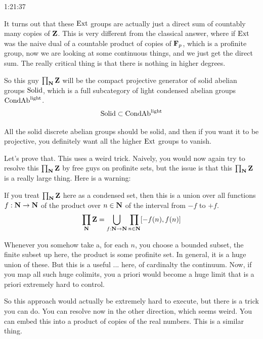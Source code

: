 \begin{unfinished}{1:21:37}
\begin{corollary}
\end{corollary}

It turns out that these $\operatorname{Ext}$ groups are actually just a direct sum of countably many copies of $\mathbf Z$. This is very different from the classical answer, where if $\operatorname{Ext}$ was the naive dual of a countable product of copies of $\mathbf F_p$, which is a profinite group, now we are looking at some continuous things, and we just get the direct sum. 
The really critical thing is that there is nothing in higher degrees.

So this guy $\prod_\mathbf N \mathbf Z$ will be the compact projective generator of solid abelian groups $\mathrm{Solid}$, which is a full subcategory of light condensed abelian groups $\mathrm{Cond}\mathrm{Ab}^{\mathrm{light}}$. 
\begin{align*}
\mathrm{Solid} \subset \mathrm{Cond}\mathrm{Ab}^{\mathrm{light}}
\end{align*}

All the solid discrete abelian groups should be solid, and then if you want it to be projective, you definitely want all the higher $\operatorname{Ext}$ groups to vanish.

Let's prove that. This uses a weird trick. Naively, you would now again try to resolve this $\prod_\mathbf N \mathbf Z$ by free guys on profinite sets, but the issue is that this $\prod_\mathbf N \mathbf Z$ is a really large thing. Here is a warning: 

\begin{warning}
If you treat $\prod_\mathbf N \mathbf Z$ here as a condensed set, then this is a union over all functions $f: \mathbf N \to \mathbf N$ of the product over $n \in \mathbf N$ of the interval from $-f$
to $+f$.
\begin{align*}
\prod_\mathbf N \mathbf Z = \bigcup_{f:\mathbf N \to \mathbf N} \prod_{n \in \mathbf N} [ - f(n), f(n)]
\end{align*}
\end{warning}

Whenever you somehow take a, for each $n$, you choose a bounded subset, the finite subset up here, the product is some profinite set.
In general, it is a huge union of these. But this is a useful ... here, of cardinalty the continuum.
Now, if you map all such huge colimits, you a priori would become a huge limit that is a priori extremely hard to control. 


So this approach would actually be extremely hard to execute, but there is a trick you can do. 
You can resolve now in the other direction, which seems weird. You can embed this into a product of copies of the real numbers. This is a similar thing.


\end{unfinished}

